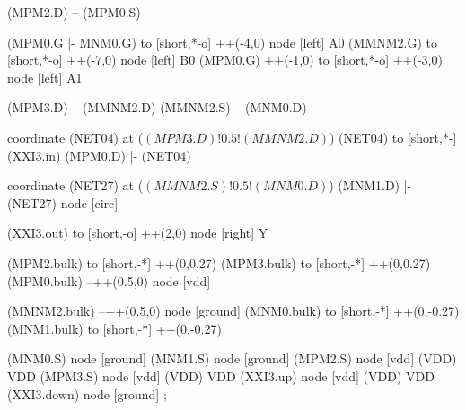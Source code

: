 \begin{circuitikz}[american]
	(MPM2.D) -- (MPM0.S)
	
	(MPM0.G |- MNM0.G) to [short,*-o] ++(-4,0) node [left] {A0}
	(MMNM2.G) to [short,*-o] ++(-7,0) node [left] {B0}
	(MPM0.G) ++(-1,0) to [short,*-o] ++(-3,0) node [left] {A1}
	
	(MPM3.D) -- (MMNM2.D)
	(MMNM2.S) -- (MNM0.D)
	
	coordinate (NET04) at ($(MPM3.D)!0.5!(MMNM2.D)$)
	(NET04) to [short,*-] (XXI3.in)
	(MPM0.D) |- (NET04)
	
	coordinate (NET27) at ($(MMNM2.S)!0.5!(MNM0.D)$)
	(MNM1.D) |- (NET27) node [circ] {}
	
	(XXI3.out) to [short,-o] ++(2,0) node [right] {Y}
	
	(MPM2.bulk) to [short,-*] ++(0,0.27)
	(MPM3.bulk) to [short,-*] ++(0,0.27)	
	(MPM0.bulk) --++(0.5,0) node [vdd]{}
	
	(MMNM2.bulk) --++(0.5,0) node [ground]{}
	(MNM0.bulk) to [short,-*] ++(0,-0.27)
	(MNM1.bulk) to [short,-*] ++(0,-0.27)	


	(MNM0.S) node [ground] {}
	(MNM1.S) node [ground] {}
	(MPM2.S) node [vdd] (VDD) {VDD}
	(MPM3.S) node [vdd] (VDD) {VDD}
	(XXI3.up) node [vdd] (VDD) {VDD}
	(XXI3.down) node [ground] {}
;

\end{circuitikz}
